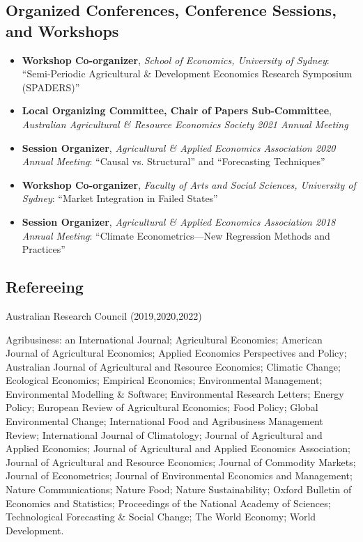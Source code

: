 \documentclass[10pt]{article}
\begin{document}
	\subsection*{Organized Conferences, Conference Sessions, and Workshops}
	\begin{itemize}
		\item {} \textbf{Workshop Co-organizer}, \textsl{School of Economics, University of Sydney}: ``Semi-Periodic Agricultural \& Development Economics Research Symposium (SPADERS)''
		\item {} \textbf{Local Organizing Committee, Chair of Papers Sub-Committee}, \textsl{Australian Agricultural \& Resource Economics Society 2021 Annual Meeting}
		\item {} \textbf{Session Organizer}, \textsl{Agricultural \& Applied Economics Association 2020 Annual Meeting}: ``Causal vs. Structural'' and ``Forecasting Techniques''
		\item {} \textbf{Workshop Co-organizer}, \textsl{Faculty of Arts and Social Sciences, University of Sydney}: ``Market Integration in Failed States''
		\item {} \textbf{Session Organizer}, \textsl{Agricultural \& Applied Economics Association 2018 Annual Meeting}: ``Climate Econometrics---New Regression Methods and Practices''
	\end{itemize}
	
	\subsection*{Refereeing}
	Australian Research Council (2019,2020,2022)
	
	\medskip
	
	Agribusiness: an International Journal; Agricultural Economics; American Journal of Agricultural Economics; Applied Economics Perspectives and Policy; Australian Journal of Agricultural and Resource Economics; Climatic Change; Ecological Economics; Empirical Economics; Environmental Management; Environmental Modelling \& Software; Environmental Research Letters; Energy Policy; European Review of Agricultural Economics; Food Policy; Global Environmental Change; International Food and Agribusiness Management Review; International Journal of Climatology; Journal of Agricultural and Applied Economics; Journal of Agricultural and Applied Economics Association; Journal of Agricultural and Resource Economics; Journal of Commodity Markets; Journal of Econometrics; Journal of Environmental Economics and Management; Nature Communications; Nature Food; Nature Sustainability; Oxford Bulletin of Economics and Statistics; Proceedings of the National Academy of Sciences; Technological Forecasting \& Social Change; The World Economy; World Development.
	
\end{document}
